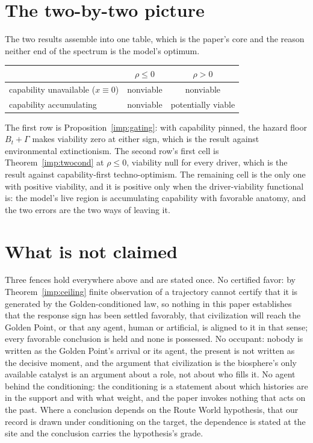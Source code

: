 \documentclass[11pt]{article}
\theoremstyle{plain}
\theoremstyle{definition}
\theoremstyle{remark}
\begin{document}
\section{The two-by-two picture}\label{sec:table}

The two results assemble into one table, which is the paper's core and
the reason neither end of the spectrum is the model's optimum.
\begin{center}
\begin{tabular}{@{}l|cc@{}}
\toprule
 & $\rho\le0$ & $\rho>0$\\
\midrule
capability unavailable ($x\equiv0$) & nonviable & nonviable\\
capability accumulating & nonviable & potentially viable\\
\bottomrule
\end{tabular}
\end{center}
The first row is Proposition~\ref{imp:gating}: with capability pinned,
the hazard floor $B_t+\Gamma$ makes viability zero at either sign, which
is the result against environmental extinctionism. The second row's
first cell is Theorem~\ref{imp:twocond} at $\rho\le0$, viability null
for every driver, which is the result against capability-first
techno-optimism. The remaining cell is the only one with positive
viability, and it is positive only when the driver-viability functional
is: the model's live region is accumulating capability with favorable
anatomy, and the two errors are the two ways of leaving it.

\section{What is not claimed}\label{sec:fences}

Three fences hold everywhere above and are stated once. No certified
favor: by Theorem~\ref{imp:ceiling} finite observation of a trajectory
cannot certify that it is generated by the Golden-conditioned law, so
nothing in this paper establishes that the response sign has been
settled favorably, that civilization will reach the Golden Point, or
that any agent, human or artificial, is aligned to it in that sense;
every favorable conclusion is held and none is possessed.
No occupant: nobody is written as the Golden Point's arrival or its
agent, the present is not written as the decisive moment, and the
argument that civilization is the biosphere's only available catalyst
is an argument about a role, not about who fills it. No agent behind
the conditioning: the conditioning is a statement about which histories
are in the support and with what weight, and the paper invokes nothing
that acts on the past. Where a conclusion depends on the Route World
hypothesis, that our record is drawn under conditioning on the target,
the dependence is stated at the site and the conclusion carries the
hypothesis's grade.
\end{document}
